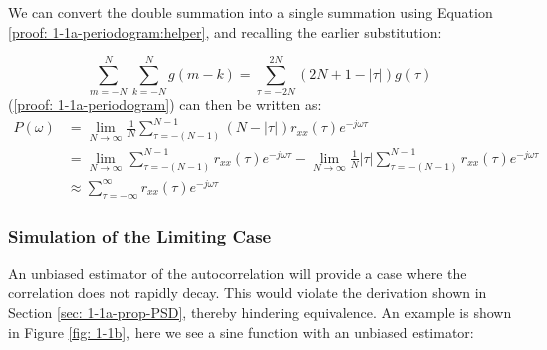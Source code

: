 \documentclass[12pt]{article}
\begin{document}
	We can convert the double summation into a single summation using Equation \ref{proof: 1-1a-periodogram:helper}, and recalling the earlier substitution:
	
	\begin{equation}
		\sum_{m=-N}^{N} \sum_{k=-N}^{N} g(m-k) = \sum_{\tau=-2N}^{2N}(2N + 1 - |\tau|)g(\tau)
		\label{proof: 1-1a-periodogram:helper}
	\end{equation}
	\newline
	(\ref{proof: 1-1a-periodogram}) can then be written as:
	\vspace{-\baselineskip}
	\begin{align}
		P(\omega)    & =         \lim_{N\to\infty} \frac{1}{N} \sum_{\tau=-(N-1)}^{N-1}(N - |\tau|)r_{xx}(\tau) e^{-j\omega\tau}\nonumber\\
		& =         \lim_{N\to\infty} \sum_{\tau=-(N-1)}^{N-1} r_{xx}(\tau) e^{-j\omega\tau} -
		\lim_{N\to\infty} \frac{1}{N} |\tau| \sum_{\tau=-(N-1)}^{N-1} r_{xx}(\tau) e^{-j\omega\tau}\nonumber\\
		& \approx   \sum_{\tau=-\infty}^{\infty} r_{xx}(\tau) e^{-j\omega\tau}
		\label{proof: 1-1a-periodogram:shown}
	\end{align}
	
	\subsubsection{Simulation of the Limiting Case} \label{sec: 1-1b-prop-PSD}
	
	An unbiased estimator of the autocorrelation will provide a case where the correlation does not rapidly decay. This would violate the derivation shown in Section \ref{sec: 1-1a-prop-PSD}, thereby hindering equivalence.
	An example is shown in Figure \ref{fig: 1-1b}, here we see a sine function with an unbiased estimator:
	
\end{document}

